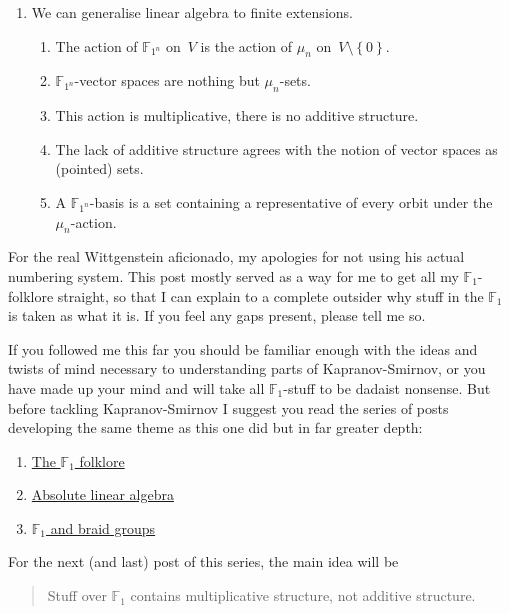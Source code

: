 \begin{enumerate}
    \item We can generalise linear algebra to finite extensions.
      \begin{enumerate}
        \item The action of $\mathbb{F}_{1^n}$ on~$V$ is the action of $\mu_n$ on~$V\setminus\left\{ 0 \right\}$.
        \item $\mathbb{F}_{1^n}$-vector spaces are nothing but $\mu_n$-sets.
        \item This action is multiplicative, there is no additive structure.
        \item The lack of additive structure agrees with the notion of vector spaces as (pointed) sets.
        \item A $\mathbb{F}_{1^n}$-basis is a set containing a representative of every orbit under the $\mu_n$-action.
      \end{enumerate}
\end{enumerate}

For the real Wittgenstein aficionado, my apologies for not using his actual numbering system. This post mostly served as a way for me to get all my $\mathbb{F}_1$-folklore straight, so that I can explain to a complete outsider why stuff in the $\mathbb{F}_1$ is taken as what it is. If you feel any gaps present, please tell me so.

If you followed me this far you should be familiar enough with the ideas and twists of mind necessary to understanding parts of Kapranov-Smirnov, or you have made up your mind and will take all $\mathbb{F}_1$-stuff to be dadaist nonsense. But before tackling Kapranov-Smirnov I suggest you read the series of posts developing the same theme as this one did but in far greater depth:
\begin{enumerate}
  \item \href{http://www.neverendingbooks.org/index.php/the-f_un-folklore.html}{The $\mathbb{F}_1$ folklore}
  \item \href{http://www.neverendingbooks.org/index.php/absolute-linear-algebra.html}{Absolute linear algebra}
  \item \href{http://www.neverendingbooks.org/index.php/f_un-and-braid-groups.html}{$\mathbb{F}_1$ and braid groups}
\end{enumerate}

For the next (and last) post of this series, the main idea will be
\begin{quote}
  Stuff over $\mathbb{F}_1$ contains multiplicative structure, not additive structure.
\end{quote}

